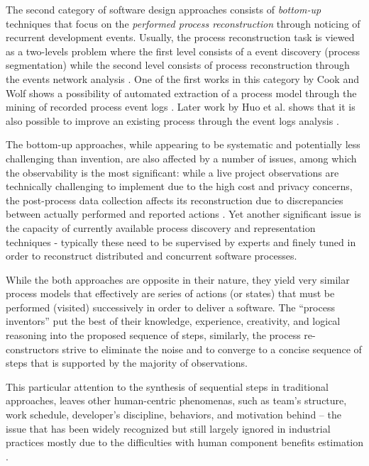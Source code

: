 The second category of software design approaches consists of \textit{bottom-up} techniques that focus 
on the \textit{performed process reconstruction} through noticing of recurrent development events. 
Usually, the process reconstruction task is viewed as a two-levels problem where the first level 
consists of a event discovery (process segmentation) while the second level consists of process 
reconstruction through the events network analysis \cite{citeulike:2703162}.
One of the first works in this category by Cook and Wolf shows a possibility of automated extraction 
of a process model through the mining of recorded process event logs 
\cite{citeulike:328044} \cite{citeulike:5120757} \cite{citeulike:5128143}. 
Later work by Huo et al. shows that it is also possible to improve an existing process
through the event logs analysis \cite{citeulike:7691059} \cite{citeulike:7690766}. 

The bottom-up approaches, while appearing to be systematic and potentially less challenging than invention, 
are also affected by a number of issues, among which the observability is the most significant: 
while a live project observations are technically challenging to implement due to the high cost and 
privacy concerns, the post-process data collection affects its reconstruction due to 
discrepancies between actually performed and reported actions \cite{citeulike:7691059}. 
Yet another significant issue is the capacity of currently available process discovery and representation 
techniques - typically these need to be supervised by experts and finely tuned in order to reconstruct 
distributed and concurrent software processes. 

While the both approaches are opposite in their nature, they yield very similar process models that 
effectively are series of actions (or states) that must be performed (visited) successively in order 
to deliver a software. The ``process inventors'' put the best of their knowledge, experience, creativity,
and logical reasoning into the proposed sequence of steps, similarly, the process re-constructors 
strive to eliminate the noise and to converge to a concise sequence of steps that is supported by the 
majority of observations. 

This particular attention to the synthesis of sequential steps in traditional approaches, 
leaves other human-centric phenomenas, such as team's structure, work schedule, 
developer's discipline, behaviors, and motivation behind -- 
the issue that has been widely recognized \cite{citeulike:149387} \cite{citeulike:113403} 
\cite{citeulike:205322} \cite{citeulike:12798652} but still largely ignored in industrial practices 
mostly due to the  difficulties with human component benefits estimation 
\cite{citeulike:12798659} \cite{citeulike:12798662} \cite{csdl2-12-11}.


